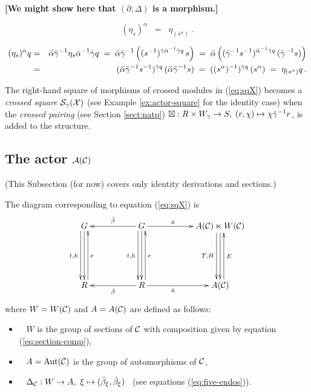 \vspace{3mm}
\noindent
{\bf [We might show here that $(\partial,\Delta)$ is a morphism.]}
\vspace{3mm}

\begin{lem}
$$
(\eta_s)^{\alpha} \;\;=\;\; \eta_{(s^{\alpha})}~.
$$
\end{lem}
\begin{pf} 
\begin{eqnarray*}
(\eta_s)^{\alpha}q 
  & = &  \ddot{\alpha} \ddot{\gamma}^{-1} \eta_s \dot{\alpha}^{-1} \dot{\gamma} q  
  \;=\;  \ddot{\alpha} \ddot{\gamma}^{-1} 
           \left( (s^{-1})^{\dot{\gamma}\dot{\alpha}^{-1}\dot{\gamma} q}\,s \right) 
  \;=\;  \ddot{\alpha}\left( (\ddot{\gamma}^{-1}s^{-1})^{\dot{\alpha}^{-1}\dot{\gamma} q}\,(\ddot{\gamma}^{-1}s)\right) \\ 
  & = &  (\ddot{\alpha} \ddot{\gamma}^{-1} s^{-1})^{\dot{\gamma} q}\,(\ddot{\alpha} \ddot{\gamma}^{-1}s)  
  \;=\;  ((s^{\alpha})^{-1})^{\dot{\gamma} q}\,(s^{\alpha}) 
  \;=\;  \eta_{(s^{\alpha})}q \,. 
\end{eqnarray*}
\end{pf}

\bigskip 
The right-hand square of morphisms of crossed modules in (\ref{eq:sqX})
becomes a \emph{crossed square} $\mathcal{S}_{\gamma}(\mathcal{X})$ 
(see Example \ref{ex:actor-square} for the identity case) 
when the \emph{crossed pairing} (see Section \ref{sect:natp}) 
$\boxtimes : R \times W_{\gamma} \to S,\; (r,\chi) \mapsto \chi \dot{\gamma}^{-1} r$, 
is added to the structure. 



\subsection{The actor $\mathcal{A}(\mathcal{C})$} \label{subs:AC}

(This Subsection (for now) covers only identity derivations and sections.) 

\medskip\noindent
The diagram corresponding to equation (\ref{eq:sqX}) is
\begin{equation} \label{eq:sqC}
\vcenter{\xymatrix{
  G \ar[dd]  \ar[dd] <-1.0ex>_{t,h}
    &&  G \ar[ll]_{\barb}  \ar[rr]^(0.4){\ddk}
          \ar[dd]  \ar[dd] <-1.0ex>_{t,h}
       &&  A(\calC) \ltimes W(\calC)  
            \ar[dd]  \ar[dd] <-1.0ex>_{T,H}  \\
    && &&   \\
  R \ar[uu] <-1.0ex>_e 
    &&  R \ar[uu] <-1.0ex>_e \ar[ll]^{\db} \ar[rr]_(0.4){\dk}
       &&  A(\calC) \ar[uu] <-1.0ex>_{E} \\
}} 
\end{equation}
where $W = W(\mathcal{C})$ and $A = A(\mathcal{C})$ are defined as follows:
\begin{itemize}
\item~
$W$ is the group of sections of $\mathcal{C}$
with composition given by equation (\ref{eq:section-comp}),
\item~
$A=\mathrm{Aut}(\mathcal{C})$ is the group of automorphisms of $\mathcal{C}$,
\item~
$\Delta_{\mathcal{C}} : W \to A,~
\xi \mapsto (\bar{\beta}_{\xi}, \dot{\beta}_{\xi})$~
(see equations (\ref{eq:five-endos})).
\end{itemize}

